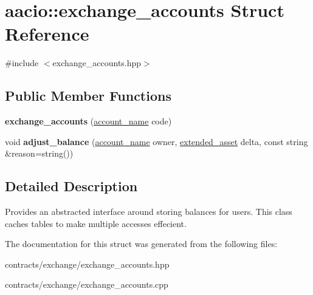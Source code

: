 \hypertarget{structaacio_1_1exchange__accounts}{}\section{aacio\+:\+:exchange\+\_\+accounts Struct Reference}
\label{structaacio_1_1exchange__accounts}


{\ttfamily \#include $<$exchange\+\_\+accounts.\+hpp$>$}

\subsection*{Public Member Functions}
\begin{DoxyCompactItemize}
\item 
\mbox{\label{structaacio_1_1exchange__accounts_a37dc80d886e5e88acdb81a4a1223b8c3}} 
{\bfseries exchange\+\_\+accounts} (\mbox{\hyperlink{structaacio_1_1chain_1_1name}{account\+\_\+name}} code)
\item 
\mbox{\label{structaacio_1_1exchange__accounts_a568febab7f348b72169da52c265caaf9}} 
void {\bfseries adjust\+\_\+balance} (\mbox{\hyperlink{structaacio_1_1chain_1_1name}{account\+\_\+name}} owner, \mbox{\hyperlink{structaacio_1_1extended__asset}{extended\+\_\+asset}} delta, const string \&reason=string())
\end{DoxyCompactItemize}


\subsection{Detailed Description}
Provides an abstracted interface around storing balances for users. This class caches tables to make multiple accesses effecient. 

The documentation for this struct was generated from the following files\+:\begin{DoxyCompactItemize}
\item 
contracts/exchange/exchange\+\_\+accounts.\+hpp\item 
contracts/exchange/exchange\+\_\+accounts.\+cpp\end{DoxyCompactItemize}
